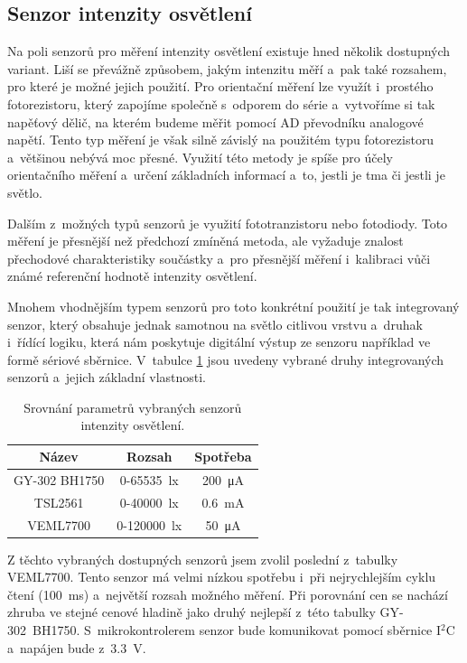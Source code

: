 \subsection{Senzor intenzity osvětlení}

Na poli senzorů pro měření intenzity osvětlení existuje hned několik dostupných variant. Liší se převážně způsobem, jakým intenzitu měří a~pak také rozsahem, pro které je možné jejich použití. Pro orientační měření lze využít i~prostého fotorezistoru, který zapojíme společně s~odporem do série a~vytvoříme si tak napěťový dělič, na kterém budeme měřit pomocí AD převodníku analogové napětí. Tento typ měření je však silně závislý na použitém typu fotorezistoru a~většinou nebývá moc přesné. Využití této metody je spíše pro účely orientačního měření a~určení základních informací a~to, jestli je tma či jestli je světlo. 

Dalším z~možných typů senzorů je využití fototranzistoru nebo fotodiody. Toto měření je přesnější než předchozí zmíněná metoda, ale vyžaduje znalost přechodové charakteristiky součástky a~pro přesnější měření i~kalibraci vůči známé referenční hodnotě intenzity osvětlení.

Mnohem vhodnějším typem senzorů pro toto konkrétní použití je tak integrovaný senzor, který obsahuje jednak samotnou na světlo citlivou vrstvu a~druhak i~řídící logiku, která nám poskytuje digitální výstup ze senzoru například ve formě sériové sběrnice. V~tabulce \ref{tab_LuxIntensitySensors} jsou uvedeny vybrané druhy integrovaných senzorů a~jejich základní vlastnosti.

\begin{table}[h]
    \caption{Srovnání parametrů vybraných senzorů intenzity osvětlení.}
    \centering
    \begin{tabular}{c|cc}
        \textbf{Název} & \textbf{Rozsah}            & \textbf{Spotřeba}         \\ \hline
        GY-302 BH1750 \cite{dat_BH1750}  & \SI{0}{}-\SI{65535}{\lux}  & \SI{200}{\micro\ampere}   \\
        TSL2561 \cite{dat_TSL2561}       & \SI{0}{}-\SI{40000}{\lux}  & \SI{0,6}{\milli\ampere}   \\
        VEML7700 \cite{dat_VEML7700}       & \SI{0}{}-\SI{120000}{\lux} & \SI{50}{\micro\ampere}
    \end{tabular}
    \label{tab_LuxIntensitySensors}
\end{table}

Z těchto vybraných dostupných senzorů jsem zvolil poslední z~tabulky VEML7700. Tento senzor má velmi nízkou spotřebu i~při nejrychlejším cyklu čtení (\SI{100}{\milli\second}) a~největší rozsah možného měření. Při porovnání cen se nachází zhruba ve stejné cenové hladině jako druhý nejlepší z~této tabulky GY-302~BH1750. S~mikrokontrolerem senzor bude komunikovat pomocí sběrnice I$^2$C a~napájen bude z~\SI{3,3}{\volt}.

